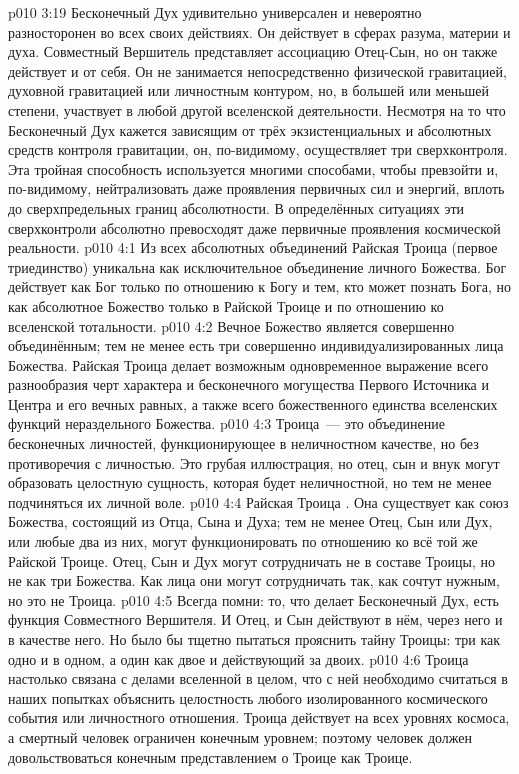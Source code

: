 \vs p010 3:19 \pc Бесконечный Дух удивительно универсален и невероятно разносторонен во всех своих действиях. Он действует в сферах разума, материи и духа. Совместный Вершитель представляет ассоциацию Отец-Сын, но он также действует и от себя. Он не занимается непосредственно физической гравитацией, духовной гравитацией или личностным контуром, но, в большей или меньшей степени, участвует в любой другой вселенской деятельности. Несмотря на то что Бесконечный Дух кажется зависящим от трёх экзистенциальных и абсолютных средств контроля гравитации, он, по\hyp{}видимому, осуществляет три сверхконтроля. Эта тройная способность используется многими способами, чтобы превзойти и, по\hyp{}видимому, нейтрализовать даже проявления первичных сил и энергий, вплоть до сверхпредельных границ абсолютности. В определённых ситуациях эти сверхконтроли абсолютно превосходят даже первичные проявления космической реальности.
\vs p010 4:1 Из всех абсолютных объединений Райская Троица (первое триединство) уникальна как исключительное объединение личного Божества. Бог действует как Бог только по отношению к Богу и тем, кто может познать Бога, но как абсолютное Божество только в Райской Троице и по отношению ко вселенской тотальности.
\vs p010 4:2 \pc Вечное Божество является совершенно объединённым; тем не менее есть три совершенно индивидуализированных лица Божества. Райская Троица делает возможным одновременное выражение всего разнообразия черт характера и бесконечного могущества Первого Источника и Центра и его вечных равных, а также всего божественного единства вселенских функций нераздельного Божества.
\vs p010 4:3 Троица~--- это объединение бесконечных личностей, функционирующее в неличностном качестве, но без противоречия с личностью. Это грубая иллюстрация, но отец, сын и внук могут образовать целостную сущность, которая будет неличностной, но тем не менее подчиняться их личной воле.
\vs p010 4:4 Райская Троица . Она существует как союз Божества, состоящий из Отца, Сына и Духа; тем не менее Отец, Сын или Дух, или любые два из них, могут функционировать по отношению ко всё той же Райской Троице. Отец, Сын и Дух могут сотрудничать не в составе Троицы, но не как три Божества. Как лица они могут сотрудничать так, как сочтут нужным, но это не Троица.
\vs p010 4:5 \pc Всегда помни: то, что делает Бесконечный Дух, есть функция Совместного Вершителя. И Отец, и Сын действуют в нём, через него и в качестве него. Но было бы тщетно пытаться прояснить тайну Троицы: три как одно и в одном, а один как двое и действующий за двоих.
\vs p010 4:6 \pc Троица настолько связана с делами вселенной в целом, что с ней необходимо считаться в наших попытках объяснить целостность любого изолированного космического события или личностного отношения. Троица действует на всех уровнях космоса, а смертный человек ограничен конечным уровнем; поэтому человек должен довольствоваться конечным представлением о Троице как Троице.
